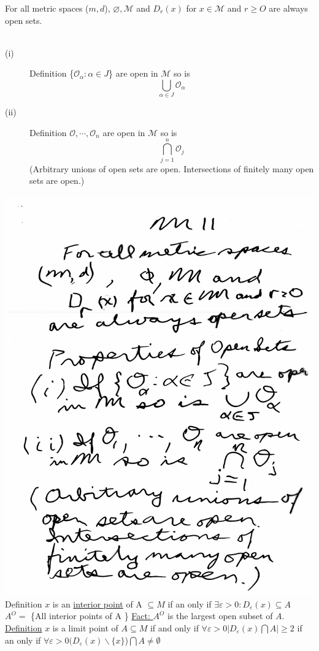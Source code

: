 \documentclass[10pt,a4paper]{article}
\begin{document}
{{\begin{flushleft}
For all metric spaces ($m,d$), $ \varnothing, \mathcal{M}$ and $D_r(x)$ for $x \in \mathcal{M}$ and $r \geq O$ are always open sets.\\
\\
\end{flushleft}
\begin{flushleft}
\begin{description}
  \item[(i)] Definition \{$\mathcal{O}_\alpha:\alpha \in J$\} are open in $\mathcal{M}$ so is $$ \bigcup_{\alpha \in J} \mathcal{O}_\alpha $$
  \item[(ii)] Definition $\mathcal{O}, \cdots, \mathcal{O}_n$ are open in $\mathcal{M}$ so is $$\bigcap^n_{j=1} \mathcal{O}_j$$ (Arbitrary unions of open sets are open. Intersections of finitely many open sets are open.) 
\end{description}
\includegraphics[scale=.4]{Pages/MS_11}
\newpage  
Definition $x$ is an \underline{interior point} of A $\subseteq M$ if an only if $\exists \varepsilon > 0: D_\varepsilon(x) \subseteq A $\\ $A^O =$ \{All interior points of A \} \underline{Fact: }$A^O$ is the largest open subset of $A$.\\ \underline{Definition} $x$ is a limit  point of $A\subseteq M$ if and only if $\forall \varepsilon>0 |D_\varepsilon(x) \bigcap A| \geq 2$ if an only if $\forall \varepsilon>0 (D_\varepsilon(x)\backslash \{x\}$)$\bigcap A \neq \emptyset$

\end{flushleft}}}
\end{document}
